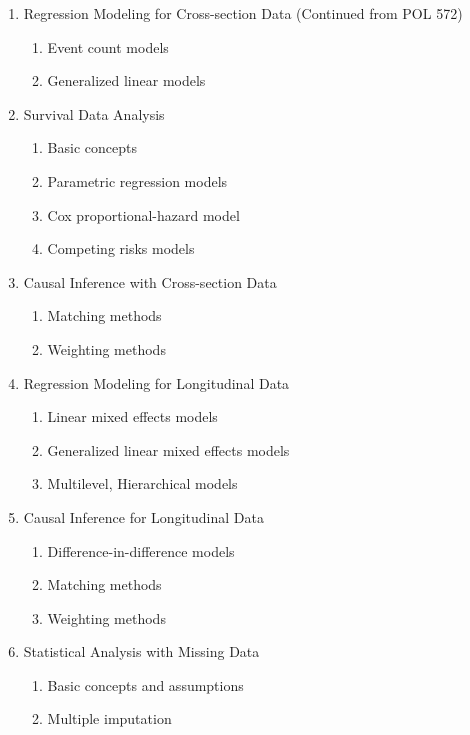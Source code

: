 \documentclass[11pt]{article}
\begin{document}
\begin{enumerate}
\item Regression Modeling for Cross-section Data (Continued from POL 572)
  \begin{enumerate}
  \item Event count models 
  \item Generalized linear models
  \end{enumerate}

\item Survival Data Analysis
 \begin{enumerate}
 \item Basic concepts
 \item Parametric regression models
 \item Cox proportional-hazard model
 \item Competing risks models
 \end{enumerate}

\item Causal Inference with Cross-section Data
  \begin{enumerate}
  \item Matching methods
  \item Weighting methods
  \end{enumerate}

\item Regression Modeling for Longitudinal Data
  \begin{enumerate}
  \item Linear mixed effects models
  \item Generalized linear mixed effects models
  \item Multilevel, Hierarchical models
 \end{enumerate}

\item Causal Inference for Longitudinal Data
  \begin{enumerate}
  \item Difference-in-difference models
  \item Matching methods
  \item Weighting methods
  \end{enumerate}

\item Statistical Analysis with Missing Data
  \begin{enumerate}
  \item Basic concepts and assumptions
 \item Multiple imputation
  \end{enumerate}

\end{enumerate}
\end{document}
